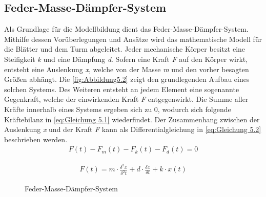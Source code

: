 \subsection{Feder-Masse-Dämpfer-System}
Als Grundlage für die Modellbildung dient das Feder-Masse-Dämpfer-System. Mithilfe dessen Vorüberlegungen und Ansätze wird das mathematische Modell für die Blätter und dem Turm abgeleitet. Jeder mechanische Körper besitzt eine Steifigkeit \textit{k} und eine Dämpfung \textit{d}. Sofern eine Kraft \textit{F} auf den Körper wirkt, entsteht eine Auslenkung \textit{x}, welche von der Masse \textit{m} und den vorher besagten Größen abhängt. Die \autoref{fig:Abbildung5.2}{} zeigt den grundlegenden Aufbau eines solchen Systems.
Des Weiteren entsteht an jedem Element eine sogenannte Gegenkraft, welche der einwirkenden Kraft \textit{F} entgegenwirkt. Die Summe aller Kräfte innerhalb eines Systems ergeben sich zu 0, wodurch sich folgende Kräftebilanz in \autoref{eq:Gleichung 5.1} wiederfindet. Der Zusammenhang zwischen der Auslenkung \textit{x} und der Kraft \textit{F} kann als Differentialgleichung in \autoref{eq:Gleichung 5.2} beschrieben werden.
\begin{align}
    F(t) - F_{m}(t) - F_{k}(t) - F_{d}(t) = 0 
    \label{eq:Gleichung 5.1}
\end{align}

\begin{align}
    F(t) = m \cdot \frac{\delta^2x}{\delta^2t} + d \cdot \frac{\delta x}{\delta t} + k \cdot x(t)
    \label{eq:Gleichung 5.2}
\end{align}
\begin{figure}[H]
\centering
{}
\caption{Feder-Masse-Dämpfer-System}
\label{fig:Abbildung5.2}
\end{figure}
\newpage
